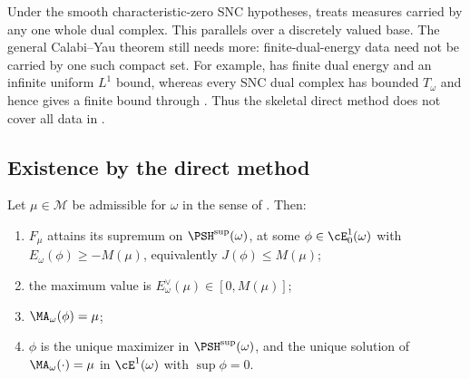 \begin{remark}
\label{rem:ch47-skeletal-weaker}
Under the smooth characteristic-zero SNC hypotheses,
 treats measures carried by
any one whole dual complex. This parallels
 over a discretely valued base.
The general Calabi--Yau theorem still needs more: finite-dual-energy
data need not be carried by one such compact set.
For example,  has finite dual energy
and an infinite uniform $L^1$ bound, whereas every SNC dual complex
has bounded $T_\omega$ and hence gives a finite bound through
. Thus the skeletal direct method
does not cover all data in .
\end{remark}

\subsection{Existence by the direct method}
\label{sec:ch47-direct}

\begin{theorem}
\label{thm:ch47-existence-admissible}
Let $\mu\in\mathcal M$ be admissible for $\omega$ in the sense of
.  Then:
\begin{enumerate}
\item\label{itm:ch47-exist:max}
      $F_\mu$ attains its supremum on $\PSH^{\sup}(\omega)$, at some
      $\phi\in\cE^1_0(\omega)$ with $E_\omega(\phi)\ge-M(\mu)$,
      equivalently $J(\phi)\le M(\mu)$;
\item\label{itm:ch47-exist:value}
      the maximum value is
      $E^\vee_\omega(\mu)\in[0,M(\mu)]$;
\item\label{itm:ch47-exist:equation}
      $\MA_\omega(\phi)=\mu$;
\item\label{itm:ch47-exist:unique}
      $\phi$ is the unique maximizer in $\PSH^{\sup}(\omega)$, and the
      unique solution of $\MA_\omega(\cdot)=\mu$ in
      $\cE^1(\omega)$ with $\sup\phi=0$.
\end{enumerate}
\end{theorem}

